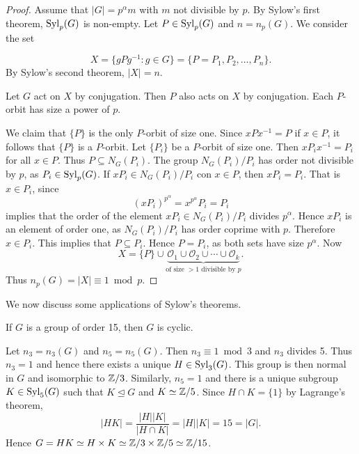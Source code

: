 \begin{proof}
    Assume that $|G|=p^{\alpha}m$ with $m$ not divisible by $p$.
    By Sylow's first theorem, $\mathrm{Syl}_p(G)$ is non-empty. Let $P\in\mathrm{Syl}_p(G)$ and $n=n_p(G)$. We consider the set  
    
        \[
        X=\{gPg^{-1}:g\in G\}=\{P=P_1,P_2,\dots,P_n\}.
        \]
    By Sylow's second theorem, $|X|=n$.

    Let $G$ act on $X$ by conjugation. Then $P$ also acts on 
    $X$ by conjugation. Each $P$-orbit has size a power of $p$. 
    
    We claim that $\{P\}$ is the only $P$-orbit of size one.  
    Since $xPx^{-1}=P$ if $x\in P$, it follows that
    $\{P\}$ is a $P$-orbit. Let $\{P_i\}$ be a $P$-orbit
    of size one. Then 
        $xP_ix^{-1}=P_i$ for all 
        $x\in P$. Thus $P\subseteq N_G(P_i)$. The group 
        $N_G(P_i)/P_i$ has order not divisible by $p$, as $P_i\in\mathrm{Syl}_p(G)$.
        If $xP_i\in N_G(P_i)/P_i$ con $x\in P$, then $xP_i=P_i$. That is
        $x\in P_i$, since 
        \[
        (xP_i)^{p^{\alpha}}=x^{p^{\alpha}}P_i=P_i
        \]
        implies that the order 
        of the element $xP_i\in N_G(P_i)/P_i$ divides $p^{\alpha}$. Hence $xP_i$ is an element of order
        one, as $N_G(P_i)/P_i$ has order coprime with $p$. Therefore 
        $x\in P_i$.
        This implies that 
        $P\subseteq P_i$. Hence $P=P_i$, as both sets 
        have size $p^{\alpha}$. Now 
        \[
        X=\{P\}\cup \underbrace{\mathcal{O}_1\cup\mathcal{O}_2\cup\cdots\cup\mathcal{O}_k}_{\text{of size $>1$ divisible by $p$}}.
        \]
        Thus $n_p(G)=|X|\equiv 1\bmod p$.
\end{proof}

We now discuss some applications of Sylow's theorems. 

\begin{example}
If $G$ is a group of order 15, then $G$ is cyclic.

Let $n_3=n_3(G)$ and $n_5=n_5(G)$. Then $n_3\equiv1\bmod 3$ and $n_3$ divides 5. Thus $n_3=1$ and hence there exists a unique
$H\in\mathrm{Syl}_3(G)$. This group is then normal in $G$ and isomorphic to
$\mathbb{Z}/3$. Similarly, 
 $n_5=1$ and there is a unique subgroup $K\in\mathrm{Syl}_5(G)$ such that
 $K\unlhd G$ and $K\simeq\mathbb{Z}/5$. Since $H\cap K=\{1\}$ by Lagrange's theorem, 
 \[
|HK|=\frac{|H||K|}{|H\cap K|}=|H||K|=15=|G|.
\]
Hence $G=HK\simeq H\times K\simeq \mathbb{Z}/3\times\mathbb{Z}/5\simeq\mathbb{Z}/15$.
\end{example}


